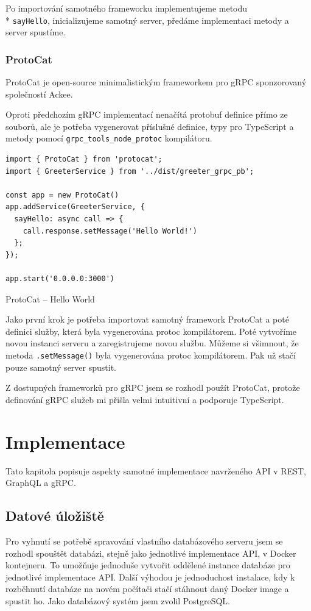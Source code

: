 \documentclass[thesis=M,czech]{FITthesis}[2019/12/23]
\begin{document}
Po importování samotného frameworku implementujeme metodu \\* \texttt{sayHello}, inicializujeme samotný server, předáme implementaci metody a server spustíme.

\subsection{ProtoCat}
ProtoCat \cite{protocat} je open-source minimalistickým frameworkem pro gRPC sponzorovaný společností Ackee. %

Oproti předchozím gRPC implementací nenačítá protobuf definice přímo ze souborů, ale je potřeba vygenerovat příslušné definice, typy pro TypeScript a metody pomocí \texttt{grpc_tools_node_protoc} kompilátoru.

\begin{listing}[h]
\begin{verbatim}
import { ProtoCat } from 'protocat';
import { GreeterService } from '../dist/greeter_grpc_pb';

const app = new ProtoCat()
app.addService(GreeterService, {
  sayHello: async call => {
    call.response.setMessage('Hello World!')
  };
});
  
app.start('0.0.0.0:3000')
\end{verbatim}
\caption{ProtoCat -- Hello World}
\label{lst:protocat_hello}
\end{listing}

Jako první krok je potřeba importovat samotný framework ProtoCat a poté definici služby, která byla vygenerována protoc kompilátorem. Poté vytvoříme novou instanci serveru a zaregistrujeme novou službu. Můžeme si všimnout, že metoda \texttt{.setMessage()} byla vygenerována protoc kompilátorem. Pak už stačí pouze samotný server spustit.

Z dostupných frameworků pro gRPC jsem se rozhodl použít ProtoCat, protože definování gRPC služeb mi přišla velmi intuitivní a podporuje TypeScript. %



\chapter{Implementace}
Tato kapitola popisuje aspekty samotné implementace navrženého API v REST, GraphQL a gRPC.

\section{Datové úložiště}
Pro vyhnutí se potřebě spravování vlastního databázového serveru jsem se rozhodl spouštět databázi, stejně jako jednotlivé implementace API, v Docker kontejneru. To umožňuje jednoduše vytvořit oddělené instance databáze pro jednotlivé implementace API. Další výhodou je jednoduchost instalace, kdy k rozběhnutí databáze na novém počítači stačí stáhnout daný Docker image a spustit ho. Jako databázový systém jsem zvolil PostgreSQL.
\end{document}
